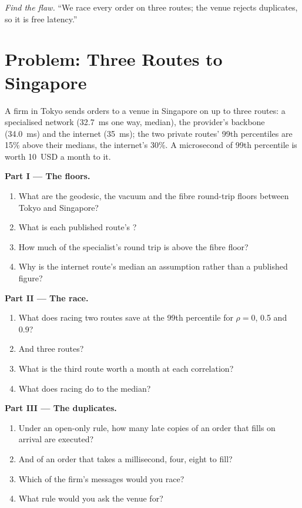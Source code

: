 \begin{exercise}[$\star\star\star$]\label{exo:nw:cross-region-crypto-networks:8}
\emph{Find the flaw.} ``We race every order on three routes; the venue rejects duplicates, so it is free latency.''
\end{exercise}

\section{Problem: Three Routes to Singapore}

\begin{problem}\label{pb:nw:cross-region-crypto-networks:1}
A firm in Tokyo sends orders to a venue in Singapore on up to three routes: a specialised network (\qty{32.7}{\milli\second} one way, median), the
provider's backbone (\qty{34.0}{\milli\second}) and the internet (\qty{35}{\milli\second}); the two private routes' 99th percentiles are 15\% above
their medians, the internet's 30\%. A microsecond of 99th percentile is worth 10~USD a month to it.

\medskip\noindent\textbf{Part I --- The floors.}
\begin{enumerate}
\item What are the geodesic, the vacuum and the fibre round-trip floors between Tokyo and Singapore?
\item What is each published route's ?
\item How much of the specialist's round trip is above the fibre floor?
\item Why is the internet route's median an assumption rather than a published figure?
\end{enumerate}

\medskip\noindent\textbf{Part II --- The race.}
\begin{enumerate}[resume]
\item What does racing two routes save at the 99th percentile for $\rho = 0$, 0.5 and 0.9?
\item And three routes?
\item What is the third route worth a month at each correlation?
\item What does racing do to the median?
\end{enumerate}

\medskip\noindent\textbf{Part III --- The duplicates.}
\begin{enumerate}[resume]
\item Under an open-only rule, how many late copies of an order that fills on arrival are executed?
\item And of an order that takes a millisecond, four, eight to fill?
\item Which of the firm's messages would you race?
\item What rule would you ask the venue for?
\end{enumerate}


\end{problem}
